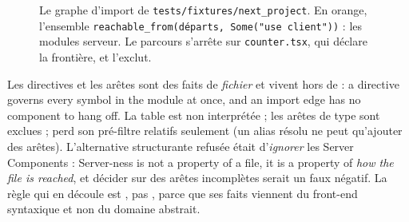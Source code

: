 \begin{figure}[htbp]\centering
{}
\caption{Le graphe d'import de \texttt{tests/fixtures/next\_project}. En orange, l'ensemble \texttt{reachable\_from(départs, Some("use client"))} : les modules serveur. Le parcours s'arrête sur \texttt{counter.tsx}, qui déclare la frontière, et l'exclut.}\label{fig:frontend-next}
\end{figure}

\begin{decision}
Les directives et les arêtes sont des faits de \emph{fichier} et vivent hors de  : \og a directive governs every symbol in the module at once, and an import edge has no component to hang off\fg{}. La table est non interprétée ; les arêtes de type sont exclues ;  perd son pré-filtre \og relatifs seulement\fg{} (un alias résolu ne peut qu'ajouter des arêtes). L'alternative structurante refusée était d'\emph{ignorer} les Server Components : \og Server-ness is not a property of a file, it is a property of \emph{how the file is reached}\fg{}, et décider sur des arêtes incomplètes serait un faux négatif. La règle qui en découle est \Warning{}, pas \Error{}, parce que ses faits viennent du front-end syntaxique et non du domaine abstrait.
\end{decision}

